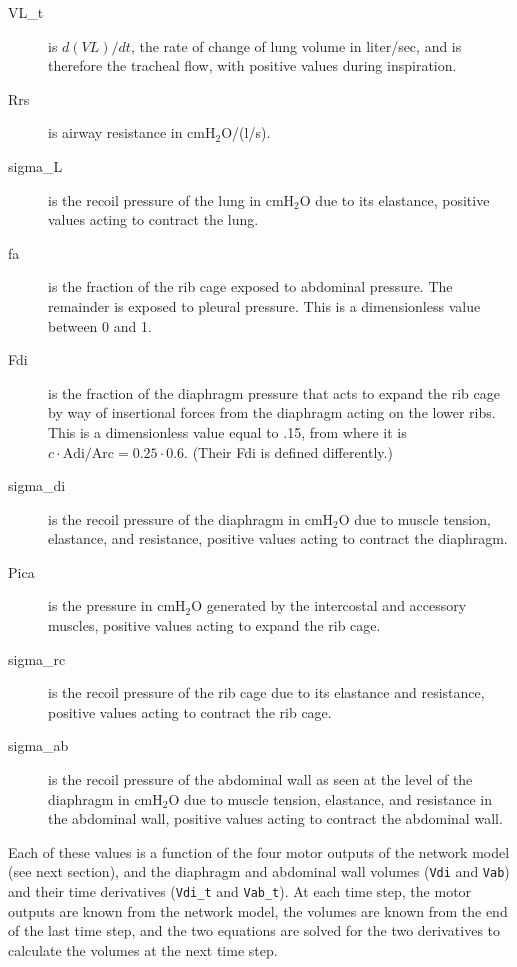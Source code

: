 \documentclass[12pt,openany,oneside]{book}
\newcommand{\ticode}[1]{\texttt{#1}}
\begin{document}
\begin{description}

\hypertarget{VL_t}{}
\item[VL\_t] is $d(VL)/dt$, the rate of change of lung volume in liter/sec, and is
therefore the tracheal flow, with positive values during inspiration.

\item[Rrs] is airway resistance in cmH$_2$O/(l/s).

\item[sigma\_L] is the recoil pressure of the lung in cmH$_2$O due to its
elastance, positive values acting to contract the lung.

\item[fa] is the fraction of the rib cage exposed to abdominal
pressure.  The remainder is exposed to pleural pressure.  This is a
dimensionless value between 0 and 1.

\item[Fdi] is the fraction of the diaphragm pressure that acts to
  expand the rib cage by way of insertional forces from the diaphragm
  acting on the lower ribs. This is a dimensionless value equal to
  .15, from \citet{Loring01091982} where it is $c\cdot\mathrm{Adi/Arc}
  = 0.25\cdot0.6$.  (Their Fdi is defined differently.)

\item[sigma\_di] is the recoil pressure of the diaphragm in cmH$_2$O due to
muscle tension, elastance, and resistance, positive values acting to
contract the diaphragm.

\item[Pica] is the pressure in cmH$_2$O generated by the intercostal and
accessory muscles, positive values acting to expand the rib cage.

\item[sigma\_rc] is the recoil pressure of the rib cage due to its elastance
and resistance, positive values acting to contract the rib cage.

\item[sigma\_ab] is the recoil pressure of the abdominal wall as seen at the
level of the diaphragm in cmH$_2$O due to muscle tension, elastance, and
resistance in the abdominal wall, positive values acting to contract
the abdominal wall.
\end{description}

Each of these values is a function of the four motor outputs of the
network model (see next section), and the diaphragm and abdominal wall
volumes (\ticode{Vdi} and \ticode{Vab}) and their time derivatives
(\ticode{Vdi\_t} and \ticode{Vab\_t}). At each time step, the motor
outputs are known from the network model, the volumes are known from
the end of the last time step, and the two equations are solved for
the two derivatives to calculate the volumes at the next time step.
\end{document}
